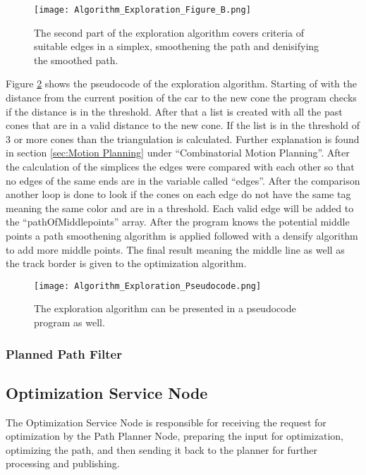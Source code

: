 \begin{figure}[H]
    \centering
    \texttt{[image: Algorithm\_Exploration\_Figure\_B.png]}
    \caption{The second part of the exploration algorithm covers criteria of suitable edges in a simplex, smoothening the path and denisifying the smoothed path.}
    \label{fig:Algorithm Exploration Figure B}
\end{figure}

Figure \ref{fig:Algorithm Exploration Pseudocode} shows the pseudocode of the exploration algorithm. Starting of with the distance from the current position of the car to the new cone the program checks if the distance is in the threshold. After that a list is created with all the past cones that are in a valid distance to the new cone. If the list is in the threshold of 3 or more cones than the triangulation is calculated. Further explanation is found in section \ref{sec:Motion Planning} under ``Combinatorial Motion Planning''. After the calculation of the simplices the edges were compared with each other so that no edges of the same ends are in the variable called ``edges''. After the comparison another loop is done to look if the cones on each edge do not have the same tag meaning the same color and are in a threshold. Each valid edge will be added to the ``pathOfMiddlepoints'' array. After the program knows the potential middle points a path smoothening algorithm is applied followed with a densify algorithm to add more middle points. The final result meaning the middle line as well as the track border is given to the optimization algorithm.

\begin{figure}[H]
    \centering
    \texttt{[image: Algorithm\_Exploration\_Pseudocode.png]}
    \caption{The exploration algorithm can be presented in a pseudocode program as well.}
    \label{fig:Algorithm Exploration Pseudocode}
\end{figure}

\subsubsection{Planned Path Filter} \label{sec:Planned Path Filter}
\lipsum[1]

\subsection{Optimization Service Node} \label{sec:Optimization Service Node}
The Optimization Service Node is responsible for receiving the request for optimization by the Path Planner Node, preparing the input for optimization, optimizing the path, and then sending it back to the planner for further processing and publishing.

